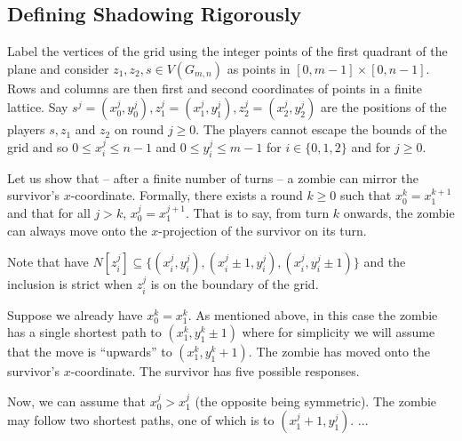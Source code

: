 \subsection{Defining Shadowing Rigorously}

Label the vertices of the grid using the integer points of the first quadrant
of the plane and consider $z_1, z_2, s \in V(G_{m,n})$ as points in $[0, m-1] \times [0, n-1]$.
Rows and columns are then first and second coordinates of points in a finite lattice.
Say $s^j = (x^j_0, y^j_0), z^j_1 = (x^j_1, y^j_1), z^j_2 = (x^j_2, y^j_2)$ are the
positions of the players $s, z_1$ and $z_2$ on round $j \geq 0$.
The players cannot escape the bounds of the grid and so
 $0 \leq x^j_i \leq n -1$ and $0 \leq y^j_i \leq m-1$ for $i \in \{0, 1, 2\}$ and for $j \geq 0$.

Let us show that -- after a finite number of turns -- a zombie can mirror
the survivor's $x$-coordinate. Formally, there exists a round $k\geq 0$ such that $x^k_0 = x^{k+1}_1$
and that for all $j > k$, $x^j_0 = x^{j+1}_1$. That is to say, from turn $k$ onwards, the zombie can
always move onto the $x$-projection of the survivor on its turn.

Note that have $N[z^j_i] \subseteq \{ (x^j_i, y^j_i), (x^j_i \pm 1, y^j_i), (x^j_i, y^j_i \pm 1) \}$
and the inclusion is strict when $z^j_i$ is on the boundary of the grid.

Suppose we already have $x^k_0 = x^k_1$. As mentioned above, in this case the
 zombie has a single shortest path to $(x^k_1, y^k_1 \pm 1)$ where for simplicity
 we will assume that the move is ``upwards'' to $(x^k_1, y^k_1 + 1)$. The zombie
 has moved onto the survivor's $x$-coordinate. The survivor has five possible responses.

Now, we can assume that $x^j_0 > x^j_1$ (the opposite being symmetric). The zombie
may follow two shortest paths, one of which is to $(x^j_1 + 1, y^j_1)$.
...
